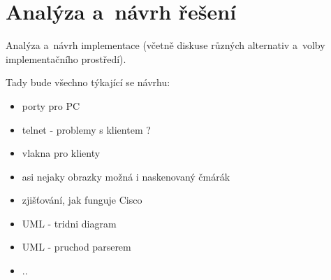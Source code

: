 \chapter{Analýza a~návrh řešení}
Analýza a~návrh implementace (včetně diskuse různých alternativ a~volby implementačního prostředí).

Tady bude všechno týkající se návrhu:
\begin{itemize}
 \item porty pro PC
 \item telnet - problemy s klientem ?
 \item vlakna pro klienty
 \item asi nejaky obrazky možná i naskenovaný čmárák
 \item zjišťování, jak funguje Cisco
 \item UML - tridni diagram
 \item UML - pruchod parserem
 \item ..
\end{itemize}

